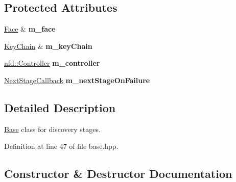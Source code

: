 \subsection*{Protected Attributes}
\begin{DoxyCompactItemize}
\item 
\hyperlink{classndn_1_1Face}{Face} \& {\bfseries m\+\_\+face}\hypertarget{classndn_1_1tools_1_1autoconfig_1_1Base_ada59c27966f9ecfee19937582ed7736d}{}\label{classndn_1_1tools_1_1autoconfig_1_1Base_ada59c27966f9ecfee19937582ed7736d}

\item 
\hyperlink{classndn_1_1security_1_1KeyChain}{Key\+Chain} \& {\bfseries m\+\_\+key\+Chain}\hypertarget{classndn_1_1tools_1_1autoconfig_1_1Base_a496d463001d8ced70f84ff298916bcb5}{}\label{classndn_1_1tools_1_1autoconfig_1_1Base_a496d463001d8ced70f84ff298916bcb5}

\item 
\hyperlink{classndn_1_1nfd_1_1Controller}{nfd\+::\+Controller} {\bfseries m\+\_\+controller}\hypertarget{classndn_1_1tools_1_1autoconfig_1_1Base_ab3d54b07f3c79715f6ca047288246794}{}\label{classndn_1_1tools_1_1autoconfig_1_1Base_ab3d54b07f3c79715f6ca047288246794}

\item 
\hyperlink{classndn_1_1tools_1_1autoconfig_1_1Base_a1b9466e64370f1ead34b754096562445}{Next\+Stage\+Callback} {\bfseries m\+\_\+next\+Stage\+On\+Failure}\hypertarget{classndn_1_1tools_1_1autoconfig_1_1Base_a187778562c657462c09004357c46f9da}{}\label{classndn_1_1tools_1_1autoconfig_1_1Base_a187778562c657462c09004357c46f9da}

\end{DoxyCompactItemize}


\subsection{Detailed Description}
\hyperlink{classndn_1_1tools_1_1autoconfig_1_1Base}{Base} class for discovery stages. 

Definition at line 47 of file base.\+hpp.



\subsection{Constructor \& Destructor Documentation}
